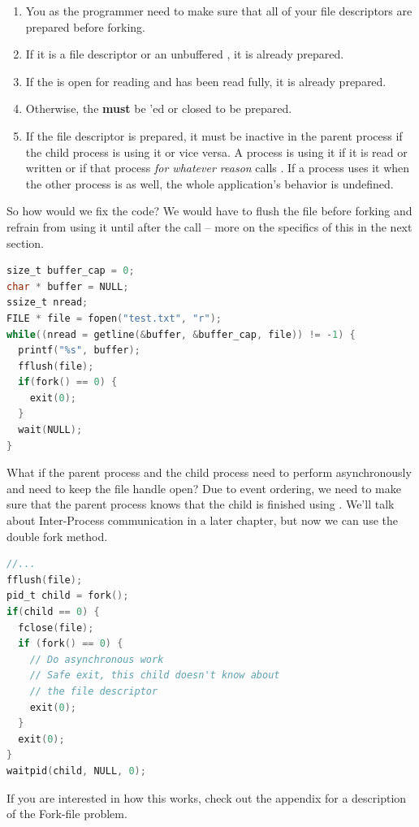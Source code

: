 \begin{enumerate}
\item You as the programmer need to make sure that all of your file descriptors are prepared before forking.
\item If it is a file descriptor or an unbuffered , it is already prepared.
\item If the  is open for reading and has been read fully, it is already prepared.
\item Otherwise, the  \textbf{must} be 'ed or closed to be prepared.
\item If the file descriptor is prepared, it must be inactive in the parent process if the child process is using it or vice versa. A process is using it if it is read or written or if that process \textit{for whatever reason} calls . If a process uses it when the other process is as well, the whole application's behavior is undefined.
\end{enumerate}

So how would we fix the code?
We would have to flush the file before forking and refrain from using it until after the  call -- more on the specifics of this in the next section.

\begin{lstlisting}[language=C]
size_t buffer_cap = 0;
char * buffer = NULL;
ssize_t nread;
FILE * file = fopen("test.txt", "r");
while((nread = getline(&buffer, &buffer_cap, file)) != -1) {
  printf("%s", buffer);
  fflush(file);
  if(fork() == 0) { 
    exit(0);
  }
  wait(NULL);
}
\end{lstlisting}

What if the parent process and the child process need to perform asynchronously and need to keep the file handle open?
Due to event ordering, we need to make sure that the parent process knows that the child is finished using .
We'll talk about Inter-Process communication in a later chapter, but now we can use the double fork method.

\begin{lstlisting}[language=C]
//... 
fflush(file);
pid_t child = fork();
if(child == 0) { 
  fclose(file);
  if (fork() == 0) {
    // Do asynchronous work
    // Safe exit, this child doesn't know about
    // the file descriptor
    exit(0);
  }
  exit(0);
}
waitpid(child, NULL, 0);
\end{lstlisting}

If you are interested in how this works, check out the appendix for a description of the Fork-file problem.

